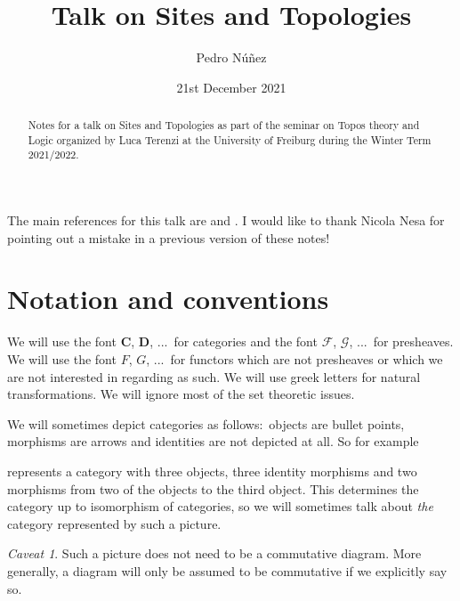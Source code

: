 \documentclass[12pt,reqno,a4paper]{amsart}
\title[Talk on Sites and Topologies]{Talk on Sites and Topologies}
\author[Pedro N\'{u}\~{n}ez]{Pedro N\'{u}\~{n}ez}
\date{21st December 2021}
\theoremstyle{plain}
\theoremstyle{definition}
\theoremstyle{remark}
\newtheorem{cav}{Caveat}
\begin{document}
\maketitle

\begin{abstract}
  Notes for a talk on Sites and Topologies as part of the seminar on Topos theory and Logic organized by Luca Terenzi at the University of Freiburg during the Winter Term 2021/2022.
\end{abstract}

\tableofcontents


The main references for this talk are \cite{sga4} and \cite{stacks-project}.
I would like to thank Nicola Nesa for pointing out a mistake in a previous version of these notes!

\setcounter{section}{-1}

\section{Notation and conventions}

We will use the font $\mathbf{C}$, $\mathbf{D}$, ...~for categories and the font $\mathscr{F}$, $\mathscr{G}$, ...~for presheaves.
We will use the font $F$, $G$, ...~for functors which are not presheaves or which we are not interested in regarding as such.
We will use greek letters for natural transformations.
We will ignore most of the set theoretic issues.

We will sometimes depict categories as follows:~objects are bullet points, morphisms are arrows and identities are not depicted at all.
So for example
\begin{center}
\end{center}
represents a category with three objects, three identity morphisms and two morphisms from two of the objects to the third object.
This determines the category up to isomorphism of categories, so we will sometimes talk about \textit{the} category represented by such a picture.

\begin{cav}
  Such a picture does not need to be a commutative diagram.
  More generally, a diagram will only be assumed to be commutative if we explicitly say so.
\end{cav}
\end{document}

